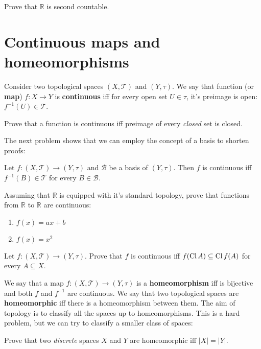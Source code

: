 \begin{prob}
  Prove that $\mathbb R$ is second countable.
\end{prob}

\section{Continuous maps and homeomorphisms}
Consider two topological spaces $(X,\mathcal T)$ and $(Y, \tau)$.
We say that function (or \textbf{map}) $f:X\to Y$ is \textbf{continuous} iff for every
open set $U\in \tau$, it's preimage is open: $f^{-1}(U)\in \mathcal T$.

\begin{prob}
  Prove that a function is continuous iff preimage of every \textit{closed} set is closed.
\end{prob}

The next problem shows that we can employ the concept of a basis to
shorten proofs:

\begin{prob}
  Let $f: (X,\mathcal T)\to (Y, \tau)$ and $\mathcal B$ be a basis of
  $(Y, \tau)$. Then $f$ is continuous iff $f^{-1}(B)\in \mathcal T$ for every $B\in \mathcal B$.
\end{prob}

\begin{prob}
  Assuming that $\mathbb R$ is equipped with it's standard topology,
  prove that functions from $\mathbb R$ to $\mathbb R$ are continuous:
  \begin{enumerate}
    \item $f(x)=ax+b$
    \item $f(x)=x^2$
  \end{enumerate}
\end{prob}

\begin{prob}
  Let $f: (X,\mathcal T)\to (Y, \tau)$. Prove that $f$ is continuous
  iff $f(\text{Cl\,} A)\subseteq \text{Cl\,} f(A)$ for every $A\subseteq X$.
\end{prob}

We say that a map $f: (X,\mathcal T)\to (Y, \tau)$ is a \textbf{homeomorphism} iff is bijective and both $f$ and $f^{-1}$ are continuous. We say that two topological spaces are \textbf{homeomorphic} iff there is a homeomorphism between them. The aim of topology is to classify all the spaces up to homeomorphisms. This is a hard problem, but we can try to classify a smaller class of spaces:

\begin{prob}
  Prove that two \textit{discrete} spaces $X$ and $Y$ are homeomorphic iff $|X|=|Y|.$
\end{prob}
